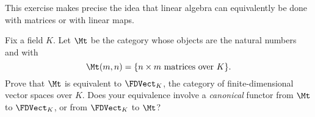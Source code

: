 \begin{exercise}
This exercise makes precise the idea that linear algebra can equivalently
be done with matrices or with linear maps.

Fix a field $K$.  Let $\Mt$ be the category whose objects are the natural
numbers and with
\[ \Mt(m, n) = \{ n \times m \text{ matrices over } K \}. \]
Prove that $\Mt$ is equivalent to $\FDVect_K$, the category of
finite-dimensional vector spaces over $K$.
Does your equivalence involve a \emph{canonical} functor from $\Mt$ to $\FDVect_K$, or from $\FDVect_K$ to $\Mt$?
\end{exercise}



